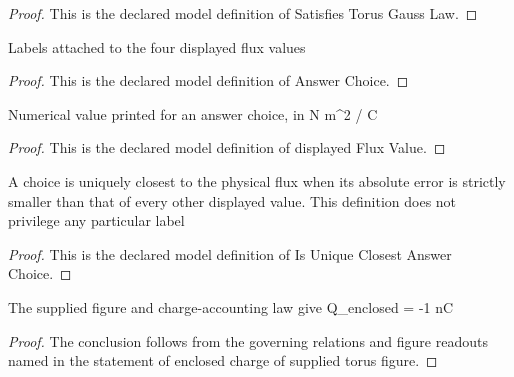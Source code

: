 \begin{proof}
  This is the declared model definition of Satisfies Torus Gauss Law.
\end{proof}
\begin{definition}
  \label{def:physics:phyx-mini-0847:phyxminiproblems-problemphyxmini0847-answerchoice}
  Labels attached to the four displayed flux values
\end{definition}
\begin{proof}
  This is the declared model definition of Answer Choice.
\end{proof}
\begin{definition}
  \label{def:physics:phyx-mini-0847:phyxminiproblems-problemphyxmini0847-displayedfluxvalue}
  Numerical value printed for an answer choice, in N m\textasciicircum{}2 / C
\end{definition}
\begin{proof}
  This is the declared model definition of displayed Flux Value.
\end{proof}
\begin{definition}
  \label{def:physics:phyx-mini-0847:phyxminiproblems-problemphyxmini0847-isuniqueclosestanswerchoice}
  A choice is uniquely closest to the physical flux when its absolute error is strictly smaller than that of every other displayed value. This definition does not privilege any particular label
\end{definition}
\begin{proof}
  This is the declared model definition of Is Unique Closest Answer Choice.
\end{proof}
\begin{theorem}
  \label{thm:physics:phyx-mini-0847:phyxminiproblems-problemphyxmini0847-enclosed-charge-of-supplied-torus-figure}
  The supplied figure and charge-accounting law give Q\_enclosed = -1 nC
\end{theorem}
\begin{proof}
  The conclusion follows from the governing relations and figure readouts named in the statement of enclosed charge of supplied torus figure.
\end{proof}
